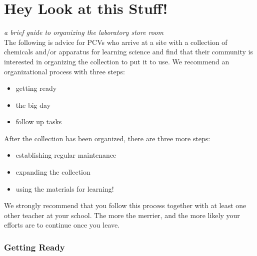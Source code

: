 %
\chapter{Hey Look at this Stuff!}
\label{cha:orderinthestoreroom}
\textit{a brief guide to organizing the laboratory store room}\\

The following is advice for PCVs who arrive at a site with a collection of chemicals and/or apparatus for learning science and find that their community is interested in organizing the collection to put it to use. We recommend an organizational process with three steps:
\begin{itemize}
\item{getting ready}
\item{the big day}
\item{follow up tasks}
\end{itemize}

After the collection has been organized, there are three more steps:
\begin{itemize}
\item{establishing regular maintenance}
\item{expanding the collection}
\item{using the materials for learning!}
\end{itemize}

We strongly recommend that you follow this process together with at least one other teacher at your school. The more the merrier, and the more likely your efforts are to continue once you leave.

\subsection{Getting Ready}

